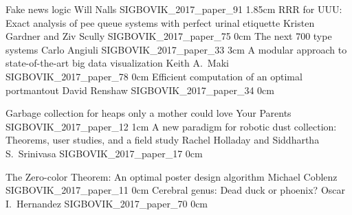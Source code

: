 \addpaper
	{Fake news logic}
	{Will Nalls}
	{}
	{SIGBOVIK_2017_paper_91}
	{1.85cm}
	{}
\addpaper
	{RRR for UUU: Exact analysis of pee queue systems with perfect urinal etiquette}
	{Kristen Gardner and Ziv Scully}
	{}
	{SIGBOVIK_2017_paper_75}
	{0cm}
	{}
\addpaper
	{The next 700 type systems}
	{Carlo Angiuli}
	{}
	{SIGBOVIK_2017_paper_33}
	{3cm}
	{}
\addpaper
	{A modular approach to state-of-the-art big data visualization}
	{Keith A.\ Maki}
	{}
	{SIGBOVIK_2017_paper_78}
	{0cm}
	{}
\addpaper
	{Efficient computation of an optimal portmantout}
	{David Renshaw}
	{}
	{SIGBOVIK_2017_paper_34}
	{0cm}
	{}

\addpaper
	{Garbage collection for heaps only a mother could love}
	{Your Parents}
	{}
	{SIGBOVIK_2017_paper_12}
	{1cm}
	{}
\addpaper
	{A new paradigm for robotic dust collection: Theorems, user studies, and a field study}
	{Rachel Holladay and Siddhartha S.\ Srinivasa}
	{}
	{SIGBOVIK_2017_paper_17}
	{0cm}
	{}

\addpaper
	{The Zero-color Theorem: An optimal poster design algorithm}
	{Michael Coblenz}
	{}
	{SIGBOVIK_2017_paper_11}
	{0cm}
	{}
\addpaper
	{Cerebral genus: Dead duck or phoenix?}
	{Oscar I.\ Hernandez}
	{}
	{SIGBOVIK_2017_paper_70}
	{0cm}
	{}
